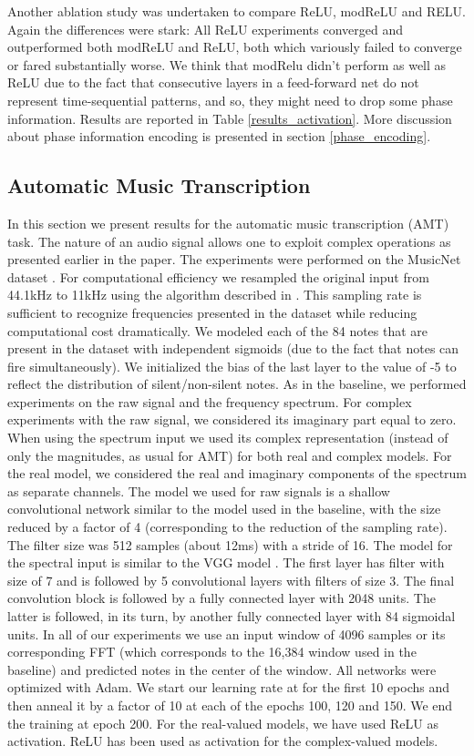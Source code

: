 \documentclass{article}
\begin{document}
Another ablation study was undertaken to compare ReLU, modReLU and RELU. Again the differences were stark: All ReLU experiments converged and outperformed both modReLU and ReLU, both which variously failed to converge or fared substantially worse. We think that modRelu didn't perform as well as ReLU due to the fact that consecutive layers in a feed-forward net do not represent time-sequential patterns, and so, they might need to drop some phase information. Results are reported in Table \ref{results_activation}. More discussion about phase information encoding is presented in section \ref{phase_encoding}.

\subsection{Automatic Music Transcription}
\label{sec:music_results}

In this section we present results for the automatic music transcription (AMT) task. The nature of an audio signal allows one to exploit complex operations as presented earlier in the paper.
The experiments were performed on the MusicNet dataset \citep{thickstun2016learning}. For computational efficiency we resampled the original input from 44.1kHz to 11kHz using the algorithm described in \cite{smith2002digital}. This sampling rate is sufficient to 
recognize frequencies presented in the dataset while reducing computational cost dramatically. We modeled each of the 84 notes that are present in the dataset with independent sigmoids (due to the fact that notes can fire simultaneously). We initialized the bias of the last layer to the value of -5 to reflect the distribution of silent/non-silent notes. As in the baseline, we performed experiments on the raw signal and the frequency spectrum. For complex experiments with the raw signal, we considered its imaginary part equal to zero. When using the spectrum input we used its complex representation (instead of only the magnitudes, as usual for AMT) for both real and complex models. For the real model, we considered the real and imaginary components of the spectrum as separate channels.
The model we used for raw signals is a shallow convolutional network similar to the model used in the baseline, with the size reduced by a factor of 4 (corresponding to the reduction of the sampling rate). The filter size was 512 samples (about 12ms) with a stride of 16. The model for the spectral input is similar to the VGG model \citep{Simonyan14}. The first layer has filter with size of 7 and is followed by 5 convolutional layers with filters of size 3. The final convolution block is followed by a fully connected layer with 2048 units. The latter is followed, in its turn, by another fully connected layer with 84 sigmoidal units. In all of our experiments we use an input window of 4096 samples or its corresponding FFT (which corresponds to the 16,384 window used in the baseline) and predicted notes in the center of the window. All networks were optimized with Adam. We start our learning rate at  for the first 10 epochs and then anneal it by a factor of 10 at each of the epochs 100, 120 and 150. We end the training at epoch 200. For the real-valued models, we have used ReLU as activation. ReLU has been used as activation for the complex-valued models.
\end{document}
